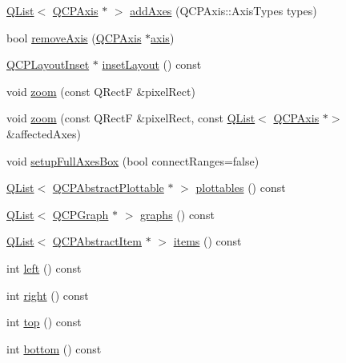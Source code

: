 \begin{DoxyCompactItemize}
\item 
\hyperlink{class_q_list}{Q\+List}$<$ \hyperlink{class_q_c_p_axis}{Q\+C\+P\+Axis} $\ast$ $>$ \hyperlink{class_q_c_p_axis_rect_a792e1f3d9cb1591fca135bb0de9b81fc}{add\+Axes} (Q\+C\+P\+Axis\+::\+Axis\+Types types)
\item 
bool \hyperlink{class_q_c_p_axis_rect_a03c39cd9704f0d36fb6cf980cdddcbaa}{remove\+Axis} (\hyperlink{class_q_c_p_axis}{Q\+C\+P\+Axis} $\ast$\hyperlink{class_q_c_p_axis_rect_a583ae4f6d78b601b732183f6cabecbe1}{axis})
\item 
\hyperlink{class_q_c_p_layout_inset}{Q\+C\+P\+Layout\+Inset} $\ast$ \hyperlink{class_q_c_p_axis_rect_a949f803466619924c7018df4b511ae10}{inset\+Layout} () const
\item 
void \hyperlink{class_q_c_p_axis_rect_a5fc8460564e81dcc2a9343dc8bc1fe67}{zoom} (const Q\+RectF \&pixel\+Rect)
\item 
void \hyperlink{class_q_c_p_axis_rect_a6a39fb3aea60a8c503bdcb3f0477d2f6}{zoom} (const Q\+RectF \&pixel\+Rect, const \hyperlink{class_q_list}{Q\+List}$<$ \hyperlink{class_q_c_p_axis}{Q\+C\+P\+Axis} $\ast$$>$ \&affected\+Axes)
\item 
void \hyperlink{class_q_c_p_axis_rect_a5fa906175447b14206954f77fc7f1ef4}{setup\+Full\+Axes\+Box} (bool connect\+Ranges=false)
\item 
\hyperlink{class_q_list}{Q\+List}$<$ \hyperlink{class_q_c_p_abstract_plottable}{Q\+C\+P\+Abstract\+Plottable} $\ast$ $>$ \hyperlink{class_q_c_p_axis_rect_a587d073a97b27bc7293fab4b2774ad59}{plottables} () const
\item 
\hyperlink{class_q_list}{Q\+List}$<$ \hyperlink{class_q_c_p_graph}{Q\+C\+P\+Graph} $\ast$ $>$ \hyperlink{class_q_c_p_axis_rect_a2d9ded3eca97be1fcb5867949391bb88}{graphs} () const
\item 
\hyperlink{class_q_list}{Q\+List}$<$ \hyperlink{class_q_c_p_abstract_item}{Q\+C\+P\+Abstract\+Item} $\ast$ $>$ \hyperlink{class_q_c_p_axis_rect_a03c113a2175448300ee8f944e24776ba}{items} () const
\item 
int \hyperlink{class_q_c_p_axis_rect_afb4a3de02046b20b9310bdb8fca781c3}{left} () const
\item 
int \hyperlink{class_q_c_p_axis_rect_a3f819d4a1b2193723d1fdafc573eea10}{right} () const
\item 
int \hyperlink{class_q_c_p_axis_rect_a45dbad181cbb9f09d068dbb76c817c95}{top} () const
\item 
int \hyperlink{class_q_c_p_axis_rect_acefdf1abaa8a8ab681e906cc2be9581e}{bottom} () const
\item 
$$
\end{DoxyCompactItemize}
